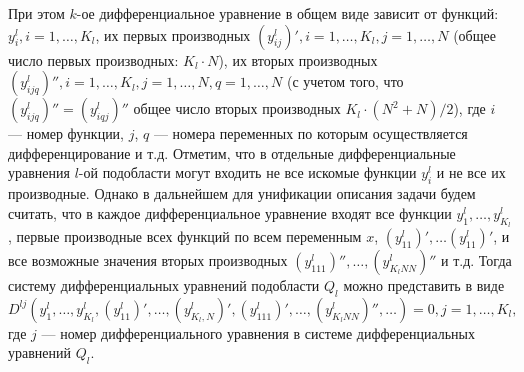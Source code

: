 \documentclass[a4paper,12pt]{article}
\begin{document}
При этом $k$-ое дифференциальное уравнение в общем виде зависит от функций:
$y^l_i, i = 1,\ldots,K_l$, их первых производных $(y^l_{ij})', i =
1,\ldots,K_l, j = 1, \ldots, N$ (общее число первых производных: $K_l \cdot
N$), их вторых производных $(y^l_{ijq})'', i = 1,\ldots,K_l, j =
1,\ldots,N, q = 1,\ldots,N$ (с учетом того, что $(y^l_{ijq})'' =
(y^l_{iqj})''$ общее число вторых производных $K_l \cdot (N^2+N) / 2$),
где $i$ --- номер функции, $j$, $q$ --- номера переменных по которым
осуществляется дифференцирование и т.д. Отметим, что в отдельные 
дифференциальные уравнения $l$-ой подобласти могут входить не все
искомые функции $y^l_i$ и не все их производные.  Однако в дальнейшем
для унификации описания задачи будем считать, что в каждое
дифференциальное уравнение входят все функции
$y^l_1,\ldots,y^l_{K_l}$, первые производные всех функций по всем
переменным $x$, $(y^l_{11})', \ldots (y^l_{11})'$, и все возможные
значения вторых производных $(y^l_{111})'', \ldots, (y^l_{K_lNN})''$ и
т.д. Тогда систему дифференциальных уравнений подобласти $Q_l$ можно
представить в виде
\begin{equation}
    D^{lj}(y^l_1,\ldots,y^l_{K_l}, (y^l_{11})',\ldots, (y^l_{K_l,N})',
           (y^l_{111})',\ldots, (y^l_{K_lNN})'',\ldots) = 0,
           j = 1, \ldots, K_l,
    \label{pde}
\end{equation}
где $j$ --- номер дифференциального уравнения в 
системе дифференциальных уравнений $Q_l$.
\end{document}
